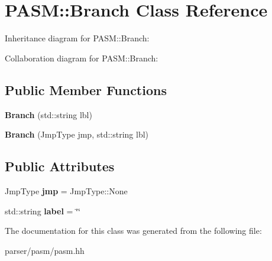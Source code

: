 \hypertarget{classPASM_1_1Branch}{}\section{P\+A\+SM\+:\+:Branch Class Reference}
\label{classPASM_1_1Branch}


Inheritance diagram for P\+A\+SM\+:\+:Branch\+:


Collaboration diagram for P\+A\+SM\+:\+:Branch\+:
\subsection*{Public Member Functions}
\begin{DoxyCompactItemize}
\item 
\mbox{\label{classPASM_1_1Branch_af821c597aabfed556b813167808c89d3}} 
{\bfseries Branch} (std\+::string lbl)
\item 
\mbox{\label{classPASM_1_1Branch_aa43b8f38f80c003270942ad875183d43}} 
{\bfseries Branch} (Jmp\+Type jmp, std\+::string lbl)
\end{DoxyCompactItemize}
\subsection*{Public Attributes}
\begin{DoxyCompactItemize}
\item 
\mbox{\label{classPASM_1_1Branch_a6133b0aa43bdc5445d4b07f24000d78d}} 
Jmp\+Type {\bfseries jmp} = Jmp\+Type\+::\+None
\item 
\mbox{\label{classPASM_1_1Branch_a6c7611188992d386214f64ccac202e18}} 
std\+::string {\bfseries label} = \char`\"{}\char`\"{}
\end{DoxyCompactItemize}


The documentation for this class was generated from the following file\+:\begin{DoxyCompactItemize}
\item 
parser/pasm/pasm.\+hh\end{DoxyCompactItemize}
